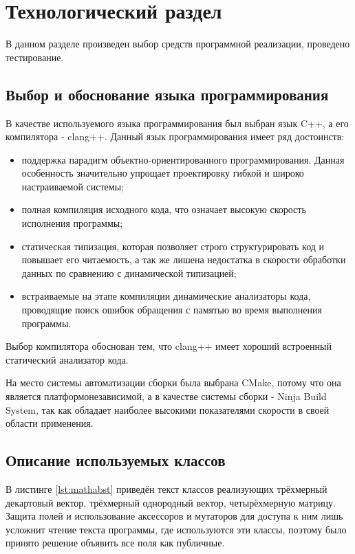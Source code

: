 \chapter{Технологический раздел}
\label{cha:impl}

В данном разделе произведен выбор средств программной реализации, проведено тестирование.

\section{Выбор и обоснование языка программирования}

В качестве используемого языка программирования был выбран язык C++, а его компилятора - clang++. Данный язык программирования имеет ряд достоинств:
\begin{itemize}
    \item поддержка парадигм объектно-ориентированного программирования. Данная особенность значительно упрощает проектировку гибкой и широко настраиваемой системы;
    \item полная компиляция исходного кода, что означает высокую скорость исполнения программы;
    \item статическая типизация, которая позволяет строго структурировать код и повышает его читаемость, а так же лишена недостатка в скорости обработки данных по сравнению с динамической типизацией;
    \item встраиваемые на этапе компиляции динамические анализаторы кода, проводящие поиск ошибок обращения с памятью во время выполнения программы.
\end{itemize}
Выбор компилятора обоснован тем, что clang++ имеет хороший встроенный статический анализатор кода.

На место системы автоматизации сборки была выбрана CMake, потому что она является платформонезависимой, а в качестве системы сборки - Ninja Build System, так как обладает наиболее высокими показателями скорости в своей области применения.

\section{Описание используемых классов}

В листинге \ref{lst:mathabst} приведён текст классов реализующих трёхмерный декартовый вектор, трёхмерный однородный вектор, четырёхмерную матрицу. Защита полей и использование аксессоров и мутаторов для доступа к ним лишь усложнит чтение текста программы, где используются эти классы, поэтому было принято решение объявить все поля как публичные.

